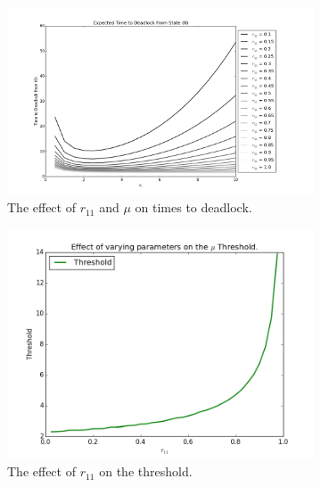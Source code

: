 \documentclass{article}
\begin{document}
\begin{figure}[!htbp]
  \begin{subfigure}[b]{0.5\textwidth}
    \includegraphics[width=\textwidth]{images/varymur11}
    \caption{The effect of $r_{11}$ and $\mu$ on times to deadlock.}
    \label{fig:varymuandr}
  \end{subfigure}
  \begin{subfigure}[b]{0.5\textwidth}
    \includegraphics[width=\textwidth]{images/plot_thresholds_r11}
    \caption{The effect of $r_{11}$ on the threshold.}
    \label{fig:threshold_r11}
  \end{subfigure}
  \begin{subfigure}[b]{0.5\textwidth}

\end{subfigure}
\end{figure}
\end{document}
